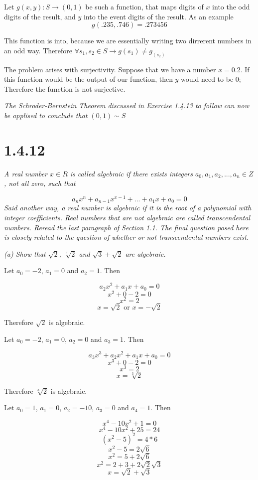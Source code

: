 \documentclass[11pt,oneside,titlepage]{book}
\begin{document}
Let $g(x, y): S \to (0, 1)$ be such a function, that maps digits of $x$ into the
odd digits of the result, and $y$ into the event digits of the result. As an example
$$g(.235, .746) = .273456$$

This function is into, because we are essentially writing two dirrerent numbers in an
odd way. 
Therefore $\forall s_1, s_2 \in S \to g(s_1) \neq g_(s_2) \ $

The problem arises with surjectivity. Suppose that we have a number $x = 0.2$. If
this function would be the output of our function, then $y$ would need to be 0;
Therefore the function is not surjective.

\textit{The Schroder-Bernstein Theorem discussed in Exercise 1.4.13 to follow
  can now be applised to conclude that $(0,1) \sim S$}

\section*{1.4.12}
\textit{A real number $x \in R$ is called algebraic if there exists integers
  $a_0, a_1, a_2, ..., a_n \in Z$, not all zero, such that }

$$a_n x^n + a_{n - 1} x^{x - 1} + ... + a_1 x + a_0 = 0$$
\textit{Said another way, a real number is algebraic if it is the root of a polynomial
  with integer coefficients. Real numbers that are not algebraic are called transcendental
  numbers. Reread the last paragraph of Section 1.1. The final question posed here is
  closely related to the question of whether or not transcendental numbers exist.}

\textit{(a) Show that $\sqrt{2}$, $\sqrt[3]{2}$ and $\sqrt{3} + \sqrt{2}$ are algebraic.}

Let $a_0 = -2$, $a_1 = 0$ and $a_2 = 1$. Then

$$a_2 x^2 + a_1 x + a_0 = 0$$
$$ x^2 + 0  - 2 = 0$$
$$x^2 = 2$$
$$x = \sqrt{2} \text{ or } x = -\sqrt{2}$$

Therefore $\sqrt{2}$ is algebraic.

Let $a_0 = -2$, $a_1 = 0$, $a_2 = 0$ and $a_3 = 1$. Then

$$a_3 x^3 + a_2 x^2 + a_1 x + a_0 = 0$$
$$ x^3 + 0  - 2 = 0$$
$$x^3 = 2$$
$$x = \sqrt[3]{2}$$

Therefore $\sqrt[3]{2}$ is algebraic.

Let $a_0 = 1$, $a_1 = 0$, $a_2 = -10$, $a_3 = 0$ and $a_4 = 1$. Then

$$x^4 - 10 x^2 + 1 = 0$$
$$x^4 - 10 x^2 + 25 =  24$$
$$(x^2 - 5)^2 =  4 * 6$$
$$x^2 - 5 =  2\sqrt{6}$$
$$x^2 = 5 + 2\sqrt{6}$$
$$x^2 = 2 + 3 + 2\sqrt{2}\sqrt{3}$$
$$x = \sqrt{2} + \sqrt{3}$$
\end{document}

